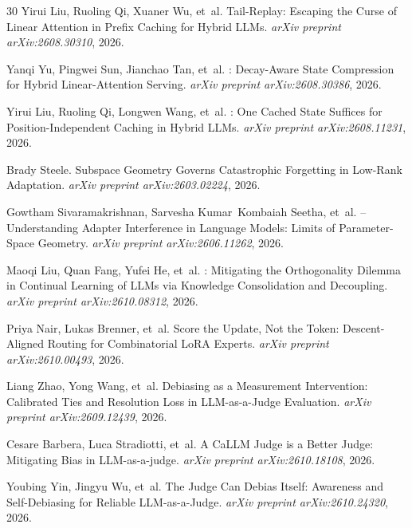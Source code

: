 \documentclass[11pt,a4paper]{article}
\begin{document}
\begin{thebibliography}{30}
Yirui Liu, Ruoling Qi, Xuaner Wu, et~al.
\newblock Tail-Replay: Escaping the Curse of Linear Attention in Prefix Caching for Hybrid {LLMs}.
\newblock \emph{arXiv preprint arXiv:2608.30310}, 2026.

Yanqi Yu, Pingwei Sun, Jianchao Tan, et~al.
: Decay-Aware State Compression for Hybrid Linear-Attention Serving.
\newblock \emph{arXiv preprint arXiv:2608.30386}, 2026.

Yirui Liu, Ruoling Qi, Longwen Wang, et~al.
: One Cached State Suffices for Position-Independent Caching in Hybrid {LLMs}.
\newblock \emph{arXiv preprint arXiv:2608.11231}, 2026.

Brady Steele.
\newblock Subspace Geometry Governs Catastrophic Forgetting in Low-Rank Adaptation.
\newblock \emph{arXiv preprint arXiv:2603.02224}, 2026.

Gowtham Sivaramakrishnan, Sarvesha Kumar~Kombaiah Seetha, et~al.
 -- Understanding Adapter Interference in Language Models: Limits of Parameter-Space Geometry.
\newblock \emph{arXiv preprint arXiv:2606.11262}, 2026.

Maoqi Liu, Quan Fang, Yufei He, et~al.
: Mitigating the Orthogonality Dilemma in Continual Learning of {LLMs} via Knowledge Consolidation and Decoupling.
\newblock \emph{arXiv preprint arXiv:2610.08312}, 2026.

Priya Nair, Lukas Brenner, et~al.
\newblock Score the Update, Not the Token: Descent-Aligned Routing for Combinatorial {LoRA} Experts.
\newblock \emph{arXiv preprint arXiv:2610.00493}, 2026.

Liang Zhao, Yong Wang, et~al.
\newblock Debiasing as a Measurement Intervention: Calibrated Ties and Resolution Loss in {LLM}-as-a-Judge Evaluation.
\newblock \emph{arXiv preprint arXiv:2609.12439}, 2026.

Cesare Barbera, Luca Stradiotti, et~al.
\newblock A {CaLLM} Judge is a Better Judge: Mitigating Bias in {LLM}-as-a-judge.
\newblock \emph{arXiv preprint arXiv:2610.18108}, 2026.

Youbing Yin, Jingyu Wu, et~al.
\newblock The Judge Can Debias Itself: Awareness and Self-Debiasing for Reliable {LLM}-as-a-Judge.
\newblock \emph{arXiv preprint arXiv:2610.24320}, 2026.


\end{thebibliography}
\end{document}
